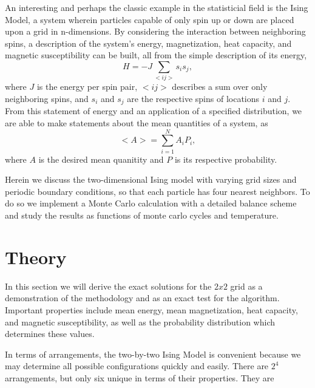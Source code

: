 \documentclass[11pt,a4paper]{article}
\begin{document}
An interesting and perhaps the classic example in the statisticial field is the Ising Model, a system wherein particles capable of only spin up or down are placed upon a grid in n-dimensions. By considering the interaction between neighboring spins, a description of the system's energy, magnetization, heat capacity, and magnetic susceptibility can be built, all from the simple description of its energy,
\begin{equation}
H = -J\sum\limits_{<ij>}s_is_j,
\end{equation}
where $J$ is the energy per spin pair, $<ij>$ describes a sum over only neighboring spins, and $s_i$ and $s_j$ are the respective spins of locations $i$ and $j$. From this statement of energy and 
an application of a specified distribution, we are able to make statements about the mean quantities of a system, as
\begin{equation}
<A> = \sum\limits^N_{i=1} A_iP_i,
\end{equation}
where $A$ is the desired mean quanitity and $P$ is its respective probability.

Herein we discuss the two-dimensional Ising model with varying grid sizes and periodic boundary conditions, so that each particle has four nearest neighbors. To do so we implement a Monte Carlo calculation with a detailed balance scheme and study the results as functions of monte carlo cycles and temperature.

\section{Theory}

In this section we will derive the exact solutions for the $2 x 2$ grid as a demonstration of the methodology and as an exact test for the algorithm. Important properties include mean energy, mean magnetization, heat capacity, and magnetic susceptibility, as well as the probability distribution which determines these values.

In terms of arrangements, the two-by-two Ising Model is convenient because we may determine all possible configurations quickly and easily. There are $2^4$ arrangements, but only six unique in terms of their properties. They are
\end{document}
